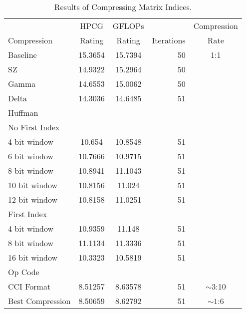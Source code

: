 \begin{table}
	\centering
	\begin{tabular}{l|S[table-format=2.6]|S[table-format=2.6]|r|c}
		            & {HPCG}   & {GFLOPs} &            & Compression \\
		Compression & {Rating} & {Rating} & Iterations & Rate \\
		\hline
		Baseline & 15.3654 & 15.7394 & 50 & 1:1 \\ %
		SZ & 14.9322 & 15.2964 & 50 & \\
		Gamma & 14.6553 & 15.0062 & 50 & \\ %
		Delta & 14.3036 & 14.6485 & 51 & \\
		Huffman & & & & \\
		\hspace{3mm}No First Index & & & & \\
			\hspace{6mm}4 bit window & 10.654 & 10.8548 & 51 & \\
			\hspace{6mm}6 bit window & 10.7666 & 10.9715 & 51 & \\
			\hspace{6mm}8 bit window & 10.8941 & 11.1043 & 51 & \\
			\hspace{6mm}10 bit window & 10.8156 & 11.024 & 51 & \\
			\hspace{6mm}12 bit window & 10.8158 & 11.0251 & 51 & \\
		\hspace{3mm}First Index & & & & \\
			\hspace{6mm}4 bit window & 10.9359 & 11.148 & 51 & \\
			\hspace{6mm}8 bit window & 11.1134 & 11.3336 & 51 & \\
			\hspace{6mm}16 bit window & 10.3323 & 10.5819 & 51 & \\
		Op Code & & & & \\
		\hspace{3mm}CCI Format~\cite{Lawlor:2013:compression} & 8.51257 & 8.63578 & 51 & \({\sim}3\):10 \\
		\hspace{3mm}Best Compression & 8.50659 & 8.62792 & 51 & \({\sim}1\):6 \\
	\end{tabular}
	\caption{Results of Compressing Matrix Indices.}
	\label{tab:results-ind}
\end{table}
